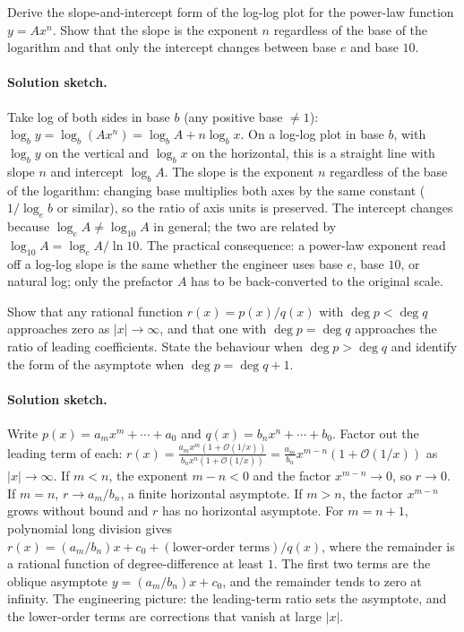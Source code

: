 \begin{exercise}
Derive the slope-and-intercept form of the log-log plot for the
power-law function $y = A x^{n}$. Show that the slope is the exponent
$n$ regardless of the base of the logarithm and that only the
intercept changes between base $e$ and base $10$.

\paragraph{Solution sketch.}
Take log of both sides in base $b$ (any positive base $\neq 1$):
$\log_{b} y = \log_{b}(A x^{n}) = \log_{b} A + n \log_{b} x$.
On a log-log plot in base $b$, with $\log_{b} y$ on the vertical
and $\log_{b} x$ on the horizontal, this is a straight line with
slope $n$ and intercept $\log_{b} A$. The slope is the exponent
$n$ regardless of the base of the logarithm: changing base
multiplies both axes by the same constant ($1/\log_{e} b$ or
similar), so the ratio of axis units is preserved. The intercept
changes because $\log_{e} A \neq \log_{10} A$ in general; the
two are related by $\log_{10} A = \log_{e} A / \ln 10$. The
practical consequence: a power-law exponent read off a log-log
slope is the same whether the engineer uses base $e$, base $10$,
or natural log; only the prefactor $A$ has to be back-converted to
the original scale.
\end{exercise}

\begin{exercise}
Show that any rational function $r(x) = p(x)/q(x)$ with $\deg p <
\deg q$ approaches zero as $|x| \to \infty$, and that one with $\deg
p = \deg q$ approaches the ratio of leading coefficients. State the
behaviour when $\deg p > \deg q$ and identify the form of the
asymptote when $\deg p = \deg q + 1$.

\paragraph{Solution sketch.}
Write $p(x) = a_{m} x^{m} + \cdots + a_{0}$ and $q(x) = b_{n} x^{n}
+ \cdots + b_{0}$. Factor out the leading term of each:
$r(x) = \frac{a_{m} x^{m}(1 + \mathcal{O}(1/x))}{b_{n} x^{n}(1 +
\mathcal{O}(1/x))} = \frac{a_{m}}{b_{n}} x^{m - n}(1 +
\mathcal{O}(1/x))$ as $|x| \to \infty$. If $m < n$, the exponent
$m - n < 0$ and the factor $x^{m-n} \to 0$, so $r \to 0$. If $m = n$,
$r \to a_{m}/b_{n}$, a finite horizontal asymptote. If $m > n$, the
factor $x^{m-n}$ grows without bound and $r$ has no horizontal
asymptote. For $m = n + 1$, polynomial long division gives
$r(x) = (a_{m}/b_{n}) x + c_{0} + (\text{lower-order terms})/q(x)$,
where the remainder is a rational function of degree-difference at
least $1$. The first two terms are the oblique asymptote
$y = (a_{m}/b_{n}) x + c_{0}$, and the remainder tends to zero at
infinity. The engineering picture: the leading-term ratio sets the
asymptote, and the lower-order terms are corrections that vanish
at large $|x|$.
\end{exercise}

